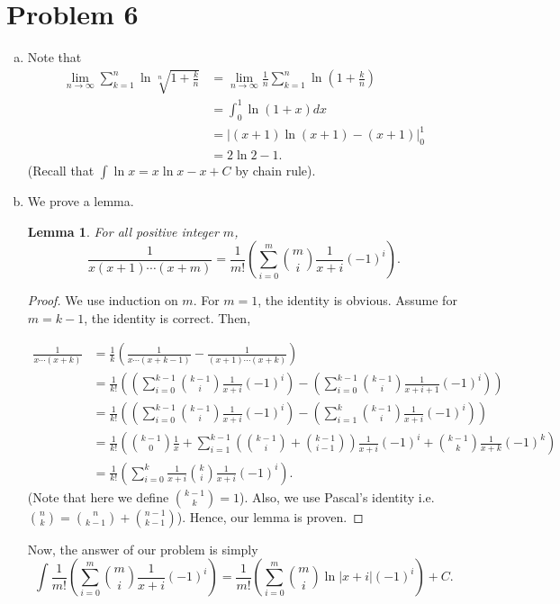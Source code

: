 \documentclass[12pt,a4paper]{article}
\newtheorem{lemma}{Lemma}
\newtheorem{proof}{Proof}
\begin{document}
    \section*{Problem 6}
    \begin{enumerate}[a.]
        \item Note that 
        \begin{align*}
        \lim_{n \rightarrow \infty} \sum_{k=1} ^n \ln{\sqrt[n]{1+\frac{k}{n}}} &= \lim_{n \rightarrow \infty} \frac{1}{n} \sum_{k=1} ^n \ln{\left(1+\frac{k}{n}\right)} \\
        &= \int_0 ^1 \ln{(1+x)} dx \\
        &= \left \lvert  (x+1) \ln{(x+1)} - (x+1) \right \rvert_0 ^1 \\
        &= 2\ln{2}-1. 
        \end{align*}
        (Recall that $\int \ln{x} = x\ln{x}-x+C$ by chain rule).
        \item We prove a lemma.
        \begin{lemma}
        For all positive integer $m$, $$\frac{1}{x(x+1)\cdots(x+m)} = \frac{1}{m!} \left( \sum_{i=0} ^m \binom{m}{i} \frac{1}{x+i} (-1)^i \right). $$
        \end{lemma}
        \begin{proof}
        We use induction on $m$. For $m=1$, the identity is obvious. Assume for $m = k-1$, the identity is correct. Then,
        
        \begin{align*}
        \frac{1}{x\cdots(x+k)} &= \frac{1}{k} \left( \frac{1}{x\cdots(x+k-1)} - \frac{1}{(x+1)\cdots(x+k)} \right) \\
        &= \frac{1}{k!} \left( \left( \sum_{i=0} ^{k-1} \binom{k-1}{i} \frac{1}{x+i} (-1)^i \right) -\left( \sum_{i=0} ^{k-1} \binom{k-1}{i} \frac{1}{x+i+1} (-1)^i \right) \right)  \\
        &=\frac{1}{k!} \left( \left( \sum_{i=0} ^{k-1} \binom{k-1}{i} \frac{1}{x+i} (-1)^i \right) -\left( \sum_{i=1} ^{k} \binom{k-1}{i} \frac{1}{x+i} (-1)^i \right) \right) \\
        &= \frac{1}{k!} \left( \binom{k-1}{0} \frac{1}{x} + \sum_{i=1}^{k-1} \left( \binom{k-1}{i}+\binom{k-1}{i-1} \right) \frac{1}{x+i} (-1)^i +  \binom{k-1}{k} \frac{1}{x+k}(-1)^k  \right)  \\
        &= \frac{1}{k!} \left( \sum_{i=0} ^k \frac{1}{x+i} \binom{k}{i} \frac{1}{x+i} (-1)^i\right).
        \end{align*}
        (Note that here we define $\binom{k-1}{k} = 1$). Also, we use Pascal's identity i.e. $\binom{n}{k} = \binom{n}{k-1}+\binom{n-1}{k-1}$). Hence, our lemma is proven. 
         \end{proof}
         Now, the answer of our problem is simply $$\int \frac{1}{m!} \left( \sum_{i=0} ^m \binom{m}{i} \frac{1}{x+i} (-1)^i \right) = \frac{1}{m!} \left( \sum_{i=0} ^m \binom{m}{i} \ln{|x+i|} (-1)^i \right)+C.$$
         

\end{enumerate}
\end{document}
